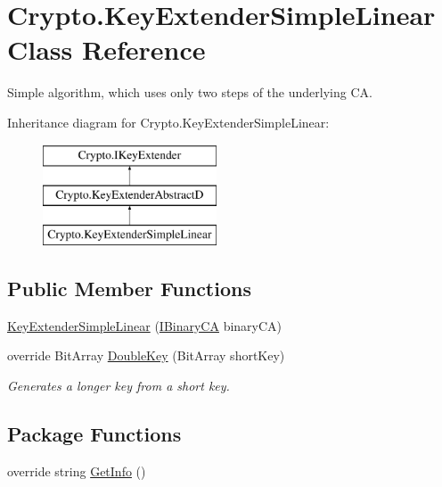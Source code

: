 \hypertarget{class_crypto_1_1_key_extender_simple_linear}{}\section{Crypto.\+Key\+Extender\+Simple\+Linear Class Reference}
\label{class_crypto_1_1_key_extender_simple_linear}


Simple algorithm, which uses only two steps of the underlying C\+A.  


Inheritance diagram for Crypto.\+Key\+Extender\+Simple\+Linear\+:\begin{figure}[H]
\begin{center}
\leavevmode
\includegraphics[height=3.000000cm]{class_crypto_1_1_key_extender_simple_linear}
\end{center}
\end{figure}
\subsection*{Public Member Functions}
\begin{DoxyCompactItemize}
\item 
\hyperlink{class_crypto_1_1_key_extender_simple_linear_a318ebefc5ef25570e751b21c071fba06}{Key\+Extender\+Simple\+Linear} (\hyperlink{interface_cellular_1_1_i_binary_c_a}{I\+Binary\+C\+A} binary\+C\+A)
\item 
override Bit\+Array \hyperlink{class_crypto_1_1_key_extender_simple_linear_a1b511ea8a0e0bb6cbd4f6a94f49015bd}{Double\+Key} (Bit\+Array short\+Key)
\begin{DoxyCompactList}\small\item\em Generates a longer key from a short key. \end{DoxyCompactList}\end{DoxyCompactItemize}
\subsection*{Package Functions}
\begin{DoxyCompactItemize}
\item 
override string \hyperlink{class_crypto_1_1_key_extender_simple_linear_abe1fa607f1a72957683f322d3f9091cf}{Get\+Info} ()
\end{DoxyCompactItemize}



